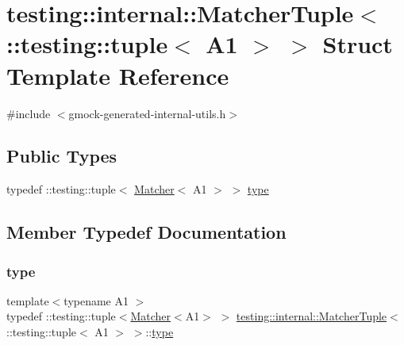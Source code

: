 \hypertarget{structtesting_1_1internal_1_1_matcher_tuple_3_01_1_1testing_1_1tuple_3_01_a1_01_4_01_4}{}\section{testing\+::internal\+::Matcher\+Tuple$<$ \+::testing\+::tuple$<$ A1 $>$ $>$ Struct Template Reference}
\label{structtesting_1_1internal_1_1_matcher_tuple_3_01_1_1testing_1_1tuple_3_01_a1_01_4_01_4}


{\ttfamily \#include $<$gmock-\/generated-\/internal-\/utils.\+h$>$}

\subsection*{Public Types}
\begin{DoxyCompactItemize}
\item 
typedef \+::testing\+::tuple$<$ \mbox{\hyperlink{classtesting_1_1_matcher}{Matcher}}$<$ A1 $>$ $>$ \mbox{\hyperlink{structtesting_1_1internal_1_1_matcher_tuple_3_01_1_1testing_1_1tuple_3_01_a1_01_4_01_4_a8463ac100366f7e8b6ad1035e42ec4b0}{type}}
\end{DoxyCompactItemize}


\subsection{Member Typedef Documentation}
\mbox{\label{structtesting_1_1internal_1_1_matcher_tuple_3_01_1_1testing_1_1tuple_3_01_a1_01_4_01_4_a8463ac100366f7e8b6ad1035e42ec4b0}} 
\subsubsection{\texorpdfstring{type}{type}}
{\footnotesize\ttfamily template$<$typename A1 $>$ \\
typedef \+::testing\+::tuple$<$\mbox{\hyperlink{classtesting_1_1_matcher}{Matcher}}$<$A1$>$ $>$ \mbox{\hyperlink{structtesting_1_1internal_1_1_matcher_tuple}{testing\+::internal\+::\+Matcher\+Tuple}}$<$ \+::testing\+::tuple$<$ A1 $>$ $>$\+::\mbox{\hyperlink{structtesting_1_1internal_1_1_matcher_tuple_3_01_1_1testing_1_1tuple_3_01_a1_01_4_01_4_a8463ac100366f7e8b6ad1035e42ec4b0}{type}}}



